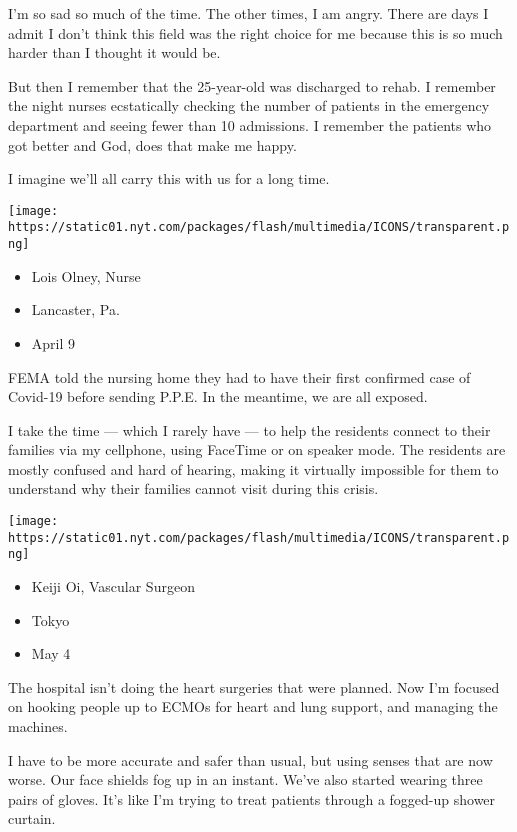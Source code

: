 I'm so sad so much of the time. The other times, I am angry. There are
days I admit I don't think this field was the right choice for me
because this is so much harder than I thought it would be.

But then I remember that the 25-year-old was discharged to rehab. I
remember the night nurses ecstatically checking the number of patients
in the emergency department and seeing fewer than 10 admissions. I
remember the patients who got better and God, does that make me happy.

I imagine we'll all carry this with us for a long time.

\texttt{[image: https://static01.nyt.com/packages/flash/multimedia/ICONS/transparent.png]}

\begin{itemize}
\tightlist
\item
  Lois Olney, Nurse
\item
  Lancaster, Pa.
\item
  April 9
\end{itemize}

FEMA told the nursing home they had to have their first confirmed case
of Covid-19 before sending P.P.E. In the meantime, we are all exposed.

I take the time --- which I rarely have --- to help the residents
connect to their families via my cellphone, using FaceTime or on speaker
mode. The residents are mostly confused and hard of hearing, making it
virtually impossible for them to understand why their families cannot
visit during this crisis.

\texttt{[image: https://static01.nyt.com/packages/flash/multimedia/ICONS/transparent.png]}

\begin{itemize}
\tightlist
\item
  Keiji Oi, Vascular Surgeon
\item
  Tokyo
\item
  May 4
\end{itemize}

The hospital isn't doing the heart surgeries that were planned. Now I'm
focused on hooking people up to ECMOs for heart and lung support, and
managing the machines.

I have to be more accurate and safer than usual, but using senses that
are now worse. Our face shields fog up in an instant. We've also started
wearing three pairs of gloves. It's like I'm trying to treat patients
through a fogged-up shower curtain.

